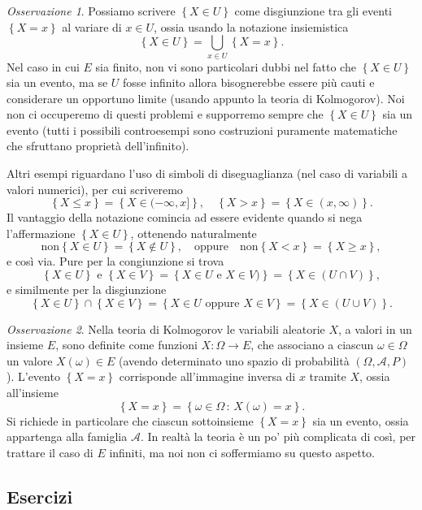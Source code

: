 \documentclass[
  italian,
  letterpaper,
]{book}
\newcommand{\cur}[1]{\left\{ #1 \right\}}
\theoremstyle{definition}
\theoremstyle{remark}
\newtheorem*{remark}{Osservazione}
\begin{document}
\begin{remark}
Possiamo scrivere \(\cur{X\in U}\) come disgiunzione tra gli eventi
\(\cur{X = x}\) al variare di \(x \in U\), ossia usando la notazione
insiemistica \[ \cur{X \in U} = \bigcup_{x \in U} \cur{ X = x}.\] Nel
caso in cui \(E\) sia finito, non vi sono particolari dubbi nel fatto
che \(\cur{X \in U}\) sia un evento, ma se \(U\) fosse infinito allora
bisognerebbe essere più cauti e considerare un opportuno limite (usando
appunto la teoria di Kolmogorov). Noi non ci occuperemo di questi
problemi e supporremo sempre che \(\cur{ X \in U}\) sia un evento (tutti
i possibili controesempi sono costruzioni puramente matematiche che
sfruttano proprietà dell'infinito).
\end{remark}

Altri esempi riguardano l'uso di simboli di diseguaglianza (nel caso di
variabili a valori numerici), per cui scriveremo
\[ \cur{ X \le x} = \cur{ X \in (-\infty, x]}, \quad \cur{ X > x } = \cur{ X \in (x, \infty)}.\]
Il vantaggio della notazione comincia ad essere evidente quando si nega
l'affermazione \(\cur{ X \in U}\), ottenendo naturalmente
\[ \text{non} \cur{X \in U} = \cur{ X \notin U }, \quad \text{oppure}  \quad \text{non} \cur{ X < x } = \cur{ X \ge x},\]
e così via. Pure per la congiunzione si trova
\[ \cur{X \in U} \text{ e  } \cur{X \in V} = \cur{ X \in U \text{ e } X \in  V)} = \cur{ X \in (U \cap V)},\]
e similmente per la disgiunzione
\[  \cur{X \in U} \cap \cur{X \in V} = \cur{ X \in U \text{ oppure } X \in V} = \cur{ X \in (U \cup V)}.\]

\begin{remark}
Nella teoria di Kolmogorov le variabili aleatorie \(X\), a valori in un
insieme \(E\), sono definite come funzioni \(X: \Omega \to E\), che
associano a ciascun \(\omega \in \Omega\) un valore \(X(\omega) \in E\)
(avendo determinato uno spazio di probabilità
\((\Omega, \mathcal{A}, P)\)). L'evento \(\cur{X=x}\) corrisponde
all'immagine inversa di \(x\) tramite \(X\), ossia all'insieme
\[ \cur{X= x} = \cur{ \omega \in \Omega \, : \, X(\omega) =x}.\] Si
richiede in particolare che ciascun sottoinsieme \(\cur{X= x}\) sia un
evento, ossia appartenga alla famiglia \(\mathcal{A}\). In realtà la
teoria è un po' più complicata di così, per trattare il caso di \(E\)
infiniti, ma noi non ci soffermiamo su questo aspetto.
\end{remark}

\subsection{Esercizi}\label{esercizi-9}
\end{document}
